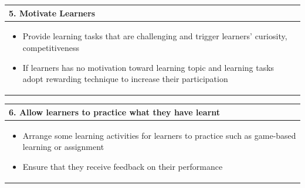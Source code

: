 \begin{table}[!htb]
\centering
\begin{tabular}{ |p{13 cm}|} 
\hline
\textbf{5. Motivate Learners}\\
\hline 
\begin{itemize} 
\item Provide learning tasks that are challenging and trigger learners' curiosity, competitiveness
\item If learners has no motivation toward learning topic and learning tasks adopt rewarding technique to increase their participation
\end{itemize} \\
\hline
\end{tabular}
\end{table}


\begin{table}[!htb]
\centering
\begin{tabular}{ |p{13 cm}|} 
\hline
\textbf{6. Allow learners to practice what they have learnt}\\
\hline 
\begin{itemize} 
\item Arrange some learning activities for learners to practice such as game-based learning or assignment
\item Ensure that they receive feedback on their performance 
\end{itemize} \\
\hline
\end{tabular}
\end{table}

